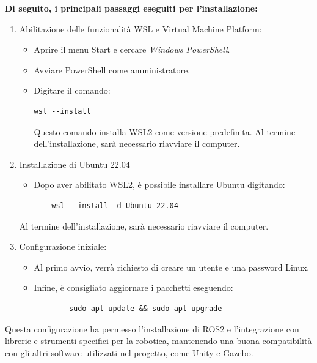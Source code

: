 \documentclass[11pt]{report}
\begin{document}
\textbf{Di seguito, i principali passaggi eseguiti per l’installazione:} \cite{Ubuntu-install}

\begin{enumerate}
    \item Abilitazione delle funzionalità WSL e Virtual Machine Platform:
    \begin{itemize}
        \item Aprire il menu Start e cercare \textit{Windows PowerShell}.
        \item Avviare PowerShell come amministratore.
        \item Digitare il comando:
        \begin{verbatim}
wsl --install
        \end{verbatim}
        Questo comando installa WSL2 come versione predefinita. Al termine dell’installazione, sarà necessario riavviare il computer.
    \end{itemize}
    \item Installazione di Ubuntu 22.04
        \begin{itemize}
            \item Dopo aver abilitato WSL2, è possibile installare Ubuntu digitando:
            \begin{verbatim}
    wsl --install -d Ubuntu-22.04
            \end{verbatim}
        \end{itemize}
    Al termine dell’installazione, sarà necessario riavviare il computer.


    \item Configurazione iniziale:
        \begin{itemize}
            \item Al primo avvio, verrà richiesto di creare un utente e una password Linux.
            \item Infine, è consigliato aggiornare i pacchetti eseguendo:
            \begin{verbatim}
        sudo apt update && sudo apt upgrade
            \end{verbatim}
        \end{itemize}
\end{enumerate}



Questa configurazione ha permesso l’installazione di ROS2 e l’integrazione con librerie e strumenti specifici per la robotica, mantenendo una buona compatibilità con gli altri software utilizzati nel progetto, come Unity e Gazebo.
\end{document}
